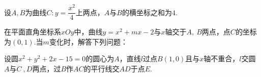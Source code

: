 \documentclass{BHCexam}
\begin{document}
\begin{questions}
\qs 设$ A,B $为曲线$ C:y=\dfrac{x^2}{4} $上两点，$ A $与$ B $的横坐标之和为$ 4. $
\qs 在平面直角坐标系$xOy$中，曲线$ y=x^2+mx-2 $与$x$轴交于$ A,~B $两点，点$ C $的坐标为$ \left(0,1\right) $.当$ m $变化时，解答下列问题：
\qs 设圆$ x^2+y^2+2x-15=0 $的圆心为$ A $，直线$ l $过点$ B(1,0) $且与$x$轴不重合，$ l $交圆$ A $与$ C~,D $两点，过$ B $作$ AC $的平行线交$ AD $于点$ E $.
\begin{parts}

\end{parts}
\end{questions}
\end{document}
